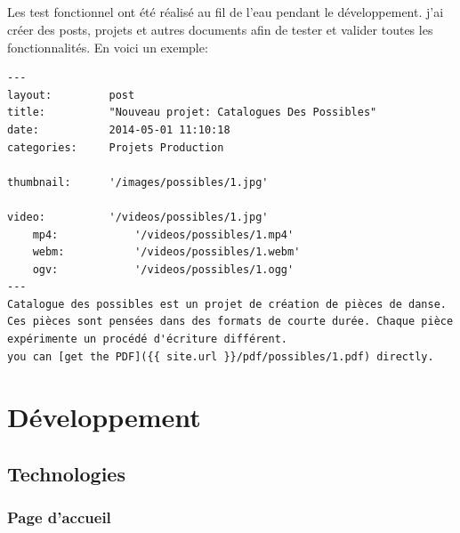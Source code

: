 \documentclass[11pt,a4paper]{report}
\begin{document}
			\paragraph*{}Les test fonctionnel ont été réalisé au fil de l'eau pendant le développement. j'ai créer des posts, projets et autres documents afin de tester et valider toutes les fonctionnalités. En voici un exemple:
			
			\begin{lstlisting}
---
layout:         post
title:          "Nouveau projet: Catalogues Des Possibles"
date:           2014-05-01 11:10:18
categories:     Projets Production

thumbnail:      '/images/possibles/1.jpg'

video:          '/videos/possibles/1.jpg'
	mp4:            '/videos/possibles/1.mp4'
	webm:           '/videos/possibles/1.webm'
	ogv:            '/videos/possibles/1.ogg'
---
Catalogue des possibles est un projet de création de pièces de danse. Ces pièces sont pensées dans des formats de courte durée. Chaque pièce expérimente un procédé d'écriture différent.
you can [get the PDF]({{ site.url }}/pdf/possibles/1.pdf) directly.
			 \end{lstlisting}
			 

\chapter{Développement}
	\section{Technologies}
		\subsection{Page d'accueil}
\end{document}
